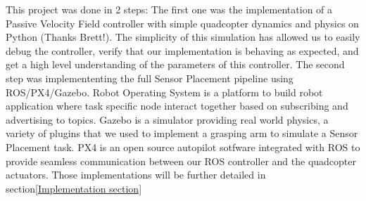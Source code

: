 This project was done in 2 steps: The first one was the implementation of a Passive Velocity Field controller with simple quadcopter dynamics and physics on Python (Thanks Brett!). The simplicity of this simulation has allowed us to easily debug the controller, verify that our implementation is behaving as expected, and get a high level understanding of the parameters of this controller. 
The second step was implemententing the full Sensor Placement pipeline using ROS/PX4/Gazebo. Robot Operating System is a platform to build robot application where task specific node interact together based on subscribing and advertising to topics. Gazebo is a simulator providing real world physics, a variety of plugins that we used to implement a grasping arm to simulate a Sensor Placement task. PX4 is an open source autopilot sotfware integrated with ROS to provide seamless communication between our ROS controller and the quadcopter actuators.
Those implementations will be further detailed in section\ref{Implementation section}


